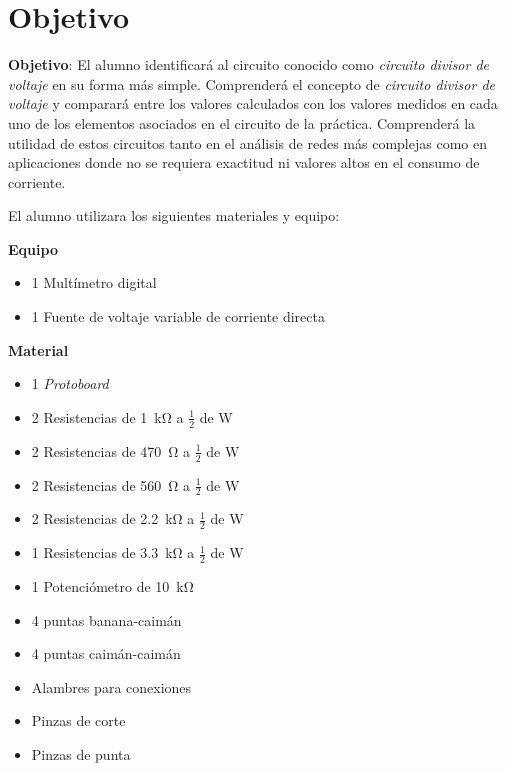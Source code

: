 \documentclass[a4paper,12pt]{article}
\begin{document}
\newpage


\section*{Objetivo}

\textbf{Objetivo}: El alumno identificará al circuito conocido como \textit{circuito divisor de voltaje} en su
forma más simple. Comprenderá el concepto de \textit{circuito divisor de voltaje} y comparará entre los valores calculados con los valores medidos en cada uno de los
elementos asociados en el circuito de la práctica. Comprenderá la utilidad de estos
circuitos tanto en el análisis de redes más complejas como en aplicaciones donde no se
requiera exactitud ni valores altos en el consumo de corriente.\par

\vspace{0.5cm}

El alumno utilizara los siguientes materiales y equipo:

\begin{multicols}{2}
\textbf{Equipo}\\
\begin{itemize}[nosep]
	\item 1 Multímetro digital
	\item 1 Fuente de voltaje variable de corriente directa
\end{itemize}

\columnbreak

\textbf{Material}\\
\begin{itemize}[nosep]
	\item 1 \textit{Protoboard}
	\item 2 Resistencias de \SI{1}{\kohm} a $\frac{1}{2}$ de \si{\watt}
	\item 2 Resistencias de \SI{470}{\ohm} a $\frac{1}{2}$ de \si{\watt}
	\item 2 Resistencias de \SI{560}{\ohm} a $\frac{1}{2}$ de \si{\watt}
	\item 2 Resistencias de \SI{2.2}{\kohm} a $\frac{1}{2}$ de \si{\watt}
	\item 1 Resistencias de \SI{3.3}{\kohm} a $\frac{1}{2}$ de \si{\watt}
	\item 1 Potenciómetro de \SI{10}{\kohm}
	\item 4 puntas banana-caimán
	\item 4 puntas caimán-caimán
	\item Alambres para conexiones
	\item Pinzas de corte
	\item Pinzas de punta
\end{itemize}

\end{multicols}
\end{document}
